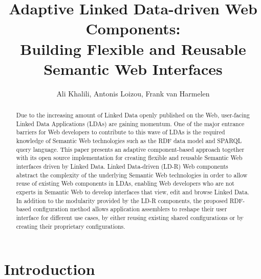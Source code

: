 \documentclass{llncs}
\begin{document}
\title{Adaptive Linked Data-driven Web Components:\\ \large{Building Flexible and Reusable Semantic Web Interfaces}}

\author{Ali Khalili, Antonis Loizou, Frank van Harmelen}

\maketitle

\begin{abstract}
Due to the increasing amount of Linked Data openly published on the Web, user-facing Linked Data Applications (LDAs) are gaining momentum.
One of the major entrance barriers for Web developers to contribute to this wave of LDAs is the required knowledge of Semantic Web technologies such as the RDF data model and SPARQL query language.
This paper presents an adaptive component-based approach together with its open source implementation for creating flexible and reusable Semantic Web interfaces driven by Linked Data.
Linked Data-driven (LD-R) Web components abstract the complexity of the underlying Semantic Web technologies in order to allow reuse of existing Web components in LDAs, enabling Web developers who are not experts in Semantic Web to develop interfaces that view, edit and browse Linked Data.
In addition to the modularity provided by the LD-R components, the proposed RDF-based configuration method allows application assemblers to reshape their user interface for different use cases, by either reusing existing shared configurations or by creating their proprietary configurations.

\end{abstract}

\section{Introduction}

\end{document}
